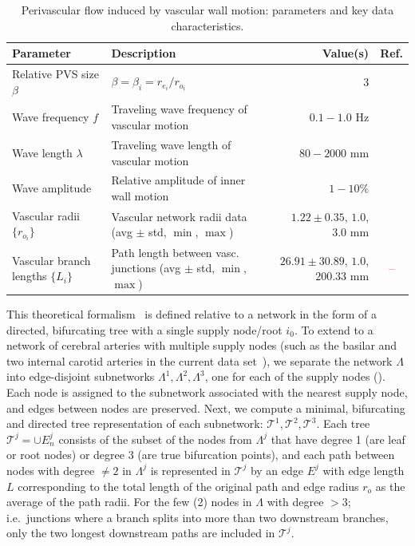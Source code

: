 \documentclass[fleqn,10pt]{wlscirep}
\newcommand{\discuss}[1]{\textcolor{red}{#1}}
\begin{document}
\begin{table}
  \small
  \begin{tabular}{llrc}
    \toprule
    Parameter & Description & Value(s)  & Ref.\\ 
    \midrule
    Relative PVS size $\beta$ & $\beta = \beta_i = r_{e_i} / r_{o_i}$ & 3 & \cite{mestre2018flow} \\
    Wave frequency $f$ & Traveling wave frequency of vascular motion & $0.1-1.0$ Hz & \discuss{\cite{gjerde2023directional}} \\
    Wave length $\lambda$ & Traveling wave length of vascular motion & $80-2000$ mm & \discuss{\cite{gjerde2023directional}} \\
    Wave amplitude & Relative amplitude of inner wall motion & $1-10\%$ & \discuss{\cite{gjerde2023directional}} \\
    Vascular radii $\{r_{o_i}\}$ & Vascular network radii data (avg $\pm$ std, $\min$, $\max$) & $1.22 \pm 0.35$, $1.0$, $3.0$  mm & \cite{hodneland2019new} \\
    Vascular branch lengths $\{L_{i}\}$ & Path length between vasc. junctions (avg $\pm$ std, $\min$, $\max$) & $26.91 \pm 30.89$, $1.0$, $200.33$  mm & \discuss{--} \\
    \bottomrule
  \end{tabular}
  \caption{Perivascular flow induced by vascular wall motion: parameters and key data characteristics.}
  \label{tab:pvs:parameters}
\end{table}


This theoretical formalism~\cite{gjerde2023directional} is defined
relative to a network in the form of a directed, bifurcating tree with
a single supply node/root $i_0$. To extend to a network of cerebral
arteries with multiple supply nodes (such as the basilar and two
internal carotid arteries in the current data
set~\cite{hodneland2019new}), we separate the network $\Lambda$ into
edge-disjoint subnetworks $\Lambda^1, \Lambda^2, \Lambda^3$, one for
each of the supply nodes (). Each node is assigned to the subnetwork associated with the nearest supply node, and edges between nodes are preserved. Next, we compute a minimal, bifurcating and directed tree representation of each subnetwork: $\mathcal{T}^1, \mathcal{T}^2, \mathcal{T}^3$. Each tree $\mathcal{T}^j = \cup E_n^j$ consists of the subset of the nodes from $\Lambda^j$ that have degree 1 (are leaf or root nodes) or degree $3$ (are true bifurcation points), and each path between nodes with degree $\not = 2$ in $\Lambda^j$ is represented in $\mathcal{T}^j$ by an edge $E^j$ with edge length $L$ corresponding to the total length of the original path and edge radius $r_o$ as the average of the path radii. For the few (2) nodes in $\Lambda$ with degree $>3$; i.e.~junctions where a branch splits into more than two downstream branches, only the two longest downstream paths are included in $\mathcal{T}^j$.
\end{document}

